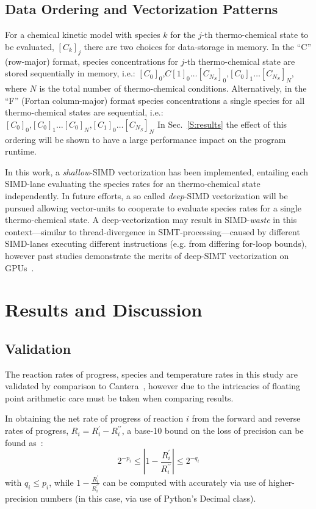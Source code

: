 \documentclass[12pt]{ussci}
\begin{document}
\subsection{Data Ordering and Vectorization Patterns}
For a chemical kinetic model with species $k$ for the $j$-th thermo-chemical state to be evaluated, $[C_k]_j$ there are two choices for data-storage in memory.
In the ``C'' (row-major) format, species concentrations for $j$-th thermo-chemical state are stored sequentially in memory, i.e.: $[C_0]_0\text{,}\allowbreak C[1]_0\ldots\allowbreak [C_{N_S}]_0\text{,}\allowbreak [C_0]_1\allowbreak\ldots\allowbreak [C_{N_S}]_N$, where $N$ is the total number of thermo-chemical conditions.
Alternatively, in the ``F'' (Fortan column-major) format species concentrations a single species for all thermo-chemical states are sequential, i.e.: $[C_0]_0\text{,}\allowbreak[C_0]_1\ldots\allowbreak[C_0]_N\text{,}\allowbreak[C_1]_0\ldots\allowbreak[C_{N_S}]_N$
In Sec.~\ref{S:results} the effect of this ordering will be shown to have a large performance impact on the program runtime.

In this work, a \textit{shallow}-SIMD vectorization has been implemented, entailing each SIMD-lane evaluating the species rates for an thermo-chemical state independently.
In future efforts, a so called \textit{deep}-SIMD vectorization will be pursued allowing vector-units to cooperate to evaluate species rates for a single thermo-chemical state.
A deep-vectorization may result in SIMD-\textit{waste} in this context---similar to thread-divergence in SIMT-processing---caused by different SIMD-lanes executing different instructions (e.g. from differing for-loop bounds), however past studies demonstrate the merits of deep-SIMT vectorization on GPUs~\cite{Sewerin20151375}.

\section{Results and Discussion}
\subsection{Validation}
The reaction rates of progress, species and temperature rates in this study are validated by comparison to Cantera~\cite{Cantera}, however due to the intricacies of floating point arithmetic care must be taken when comparing results.

In obtaining the net rate of progress of reaction $i$ from the forward and reverse rates of progress, $R_{i} = R_{i}^{\prime} - R_{i}^{\prime\prime}$, a base-10 bound on the loss of precision can be found as~\cite{goldberg1991every}:
\begin{equation}
2^{-p_i} \le \left\lvert 1 - \frac{R_{i}^{\prime}}{R_{i}^{\prime\prime}} \right\rvert \le 2^{-q_i}
\label{e:bounds}
\end{equation}
with $q_i \le p_i$, while $1 - \frac{R_{i}^{\prime}}{R_{i}^{\prime\prime}}$ can be computed with accurately via use of higher-precision numbers (in this case, via use of Python's Decimal class).
\end{document}
